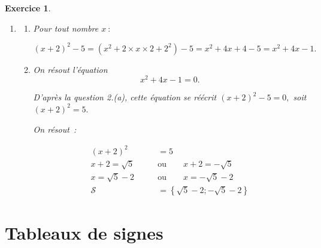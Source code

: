 \documentclass[10pt]{article}
\newtheorem{exo}{Exercice}
\begin{document}
\begin{exo}
\begin{enumerate}
\item \begin{enumerate}
\item Pour tout nombre $x~:$

\[(x+2)^2-5=\left(x^2+2\times x\times 2+2^2\right)-5=x^2+4x+4-5=x^2+4x-1.\]
\item On résout l'équation \[x^2+4x-1=0.\]

D'après la question 2.(a), cette équation se réécrit $(x+2)^2-5=0,$ soit $(x+2)^2=5.$

On résout~:

\begin{align*}(x+2)^2&=5\\
x+2=\sqrt{5} \qquad &\text{ou}\qquad x+2=-\sqrt{5}\\
x=\sqrt{5}-2 \qquad &\text{ou}\qquad x=-\sqrt{5}-2\\
\mathcal{S}&=\left\{\sqrt{5}-2;-\sqrt{5}-2\right\}
\end{align*}

\end{enumerate}


\end{enumerate}
\end{exo}


\setcounter{section}{8}

\section{Tableaux de signes}

\setcounter{exo}{110}
\end{document}
